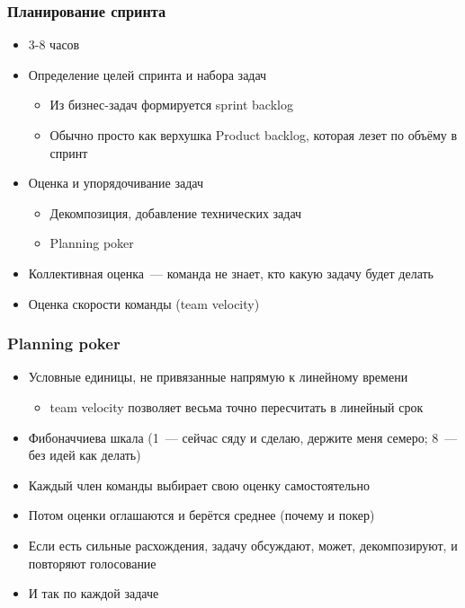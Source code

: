 \documentclass{../../slides-style}
\begin{document}
    \begin{frame}
        \frametitle{Планирование спринта}
        \begin{itemize}
            \item 3-8 часов
            \item Определение целей спринта и набора задач
            \begin{itemize}
                \item Из бизнес-задач формируется sprint backlog
                \item Обычно просто как верхушка Product backlog, которая лезет по
                объёму в спринт
            \end{itemize}
            \item Оценка и упорядочивание задач
            \begin{itemize}
                \item Декомпозиция, добавление технических задач
                \item Planning poker
            \end{itemize}
            \item Коллективная оценка~--- команда не знает, кто какую задачу
            будет делать
            \item Оценка скорости команды (team velocity)
        \end{itemize}
    \end{frame}

    \begin{frame}
        \frametitle{Planning poker}
        \begin{itemize}
            \item Условные единицы, не привязанные напрямую к линейному времени
            \begin{itemize}
                \item team velocity позволяет весьма точно пересчитать в линейный срок
            \end{itemize}
            \item Фибоначчиева шкала (1~--- сейчас сяду и сделаю, держите меня семеро; 8~--- без идей как делать)
            \item Каждый член команды выбирает свою оценку самостоятельно
            \item Потом оценки оглашаются и берётся среднее (почему и покер)
            \item Если есть сильные расхождения, задачу обсуждают, может, декомпозируют, и повторяют голосование
            \item И так по каждой задаче
        \end{itemize}
    \end{frame}
\end{document}
